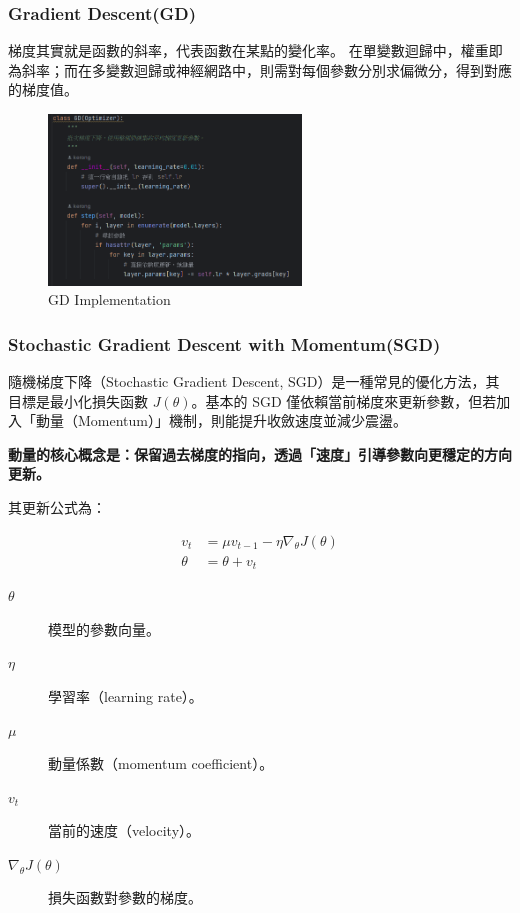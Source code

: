 \documentclass{article}
\begin{document}
\subsubsection{Gradient Descent(GD)}
梯度其實就是函數的斜率，代表函數在某點的變化率。 在單變數迴歸中，權重即為斜率；而在多變數迴歸或神經網路中，則需對每個參數分別求偏微分，得到對應的梯度值。
\begin{figure}[H]
    \centering
    \includegraphics[width=0.6\textwidth]{Lab01_report/img/6.1GD.png}
    \caption{GD Implementation}
    \label{fig:gd_code}
\end{figure}


\subsubsection{Stochastic Gradient Descent with Momentum(SGD)}

隨機梯度下降（Stochastic Gradient Descent, SGD）是一種常見的優化方法，其目標是最小化損失函數 \(J(\theta)\)。基本的 SGD 僅依賴當前梯度來更新參數，但若加入「動量（Momentum）」機制，則能提升收斂速度並減少震盪。

\textbf{動量的核心概念是：保留過去梯度的指向，透過「速度」引導參數向更穩定的方向更新。}

其更新公式為：

\[
\begin{aligned}
v_t &= \mu v_{t-1} - \eta \nabla_\theta J(\theta) \\
\theta &= \theta + v_t
\end{aligned}
\]

\begin{description}
  \item[\(\theta\)] 模型的參數向量。
  \item[\(\eta\)] 學習率（learning rate）。
  \item[\(\mu\)] 動量係數（momentum coefficient）。
  \item[\(v_t\)] 當前的速度（velocity）。
  \item[\(\nabla_\theta J(\theta)\)] 損失函數對參數的梯度。
\end{description}
\end{document}
